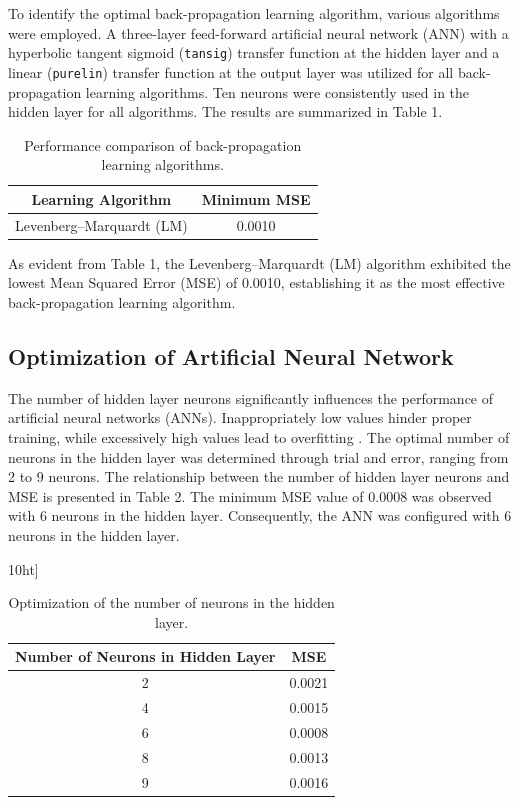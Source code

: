 \documentclass{article}
\begin{document}
To identify the optimal back-propagation learning algorithm, various algorithms were employed. A three-layer feed-forward artificial neural network (ANN) with a hyperbolic tangent sigmoid (\texttt{tansig}) transfer function at the hidden layer and a linear (\texttt{purelin}) transfer function at the output layer was utilized for all back-propagation learning algorithms. Ten neurons were consistently used in the hidden layer for all algorithms. The results are summarized in Table 1.

\begin{table}[ht]
	\centering
	\begin{tabular}{|c|c|}
		\hline
		\textbf{Learning Algorithm} & \textbf{Minimum MSE} \\ \hline
		Levenberg–Marquardt (LM)   & 0.0010              \\ \hline
	\end{tabular}
	\caption{Performance comparison of back-propagation learning algorithms.}
	\label{tab:learning_algorithms}
\end{table}

As evident from Table 1, the Levenberg–Marquardt (LM) algorithm exhibited the lowest Mean Squared Error (MSE) of 0.0010, establishing it as the most effective back-propagation learning algorithm.

\subsection{Optimization of Artificial Neural Network}

The number of hidden layer neurons significantly influences the performance of artificial neural networks (ANNs). Inappropriately low values hinder proper training, while excessively high values lead to overfitting \cite{ref11}. The optimal number of neurons in the hidden layer was determined through trial and error, ranging from 2 to 9 neurons. The relationship between the number of hidden layer neurons and MSE is presented in Table 2. The minimum MSE value of 0.0008 was observed with 6 neurons in the hidden layer. Consequently, the ANN was configured with 6 neurons in the hidden layer.

\begin{table}10ht]
	\centering
	\begin{tabular}{|c|c|}
		\hline
		\textbf{Number of Neurons in Hidden Layer} & \textbf{MSE} \\ \hline
		2                                          & 0.0021      \\ \hline
		4                                          & 0.0015      \\ \hline
		6                                          & 0.0008      \\ \hline
		8                                          & 0.0013      \\ \hline
		9                                          & 0.0016      \\ \hline
	\end{tabular}
	\caption{Optimization of the number of neurons in the hidden layer.}
	\label{tab:hidden_layer_neurons}
\end{table}
\end{document}
